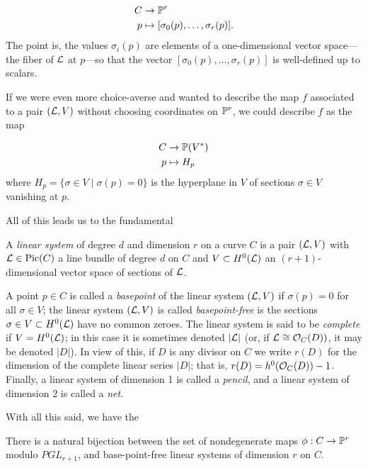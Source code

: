 \begin{align*}
C &\to \PP^r \\
p &\mapsto [\sigma_0(p),\dots,\sigma_r(p)].
\end{align*}
The point is,  the values $\sigma_i(p)$ are elements of a one-dimensional vector space---the fiber of $\cL$ at $p$---so that the vector $[\sigma_0(p),\dots,\sigma_r(p)]$ is well-defined up to scalars.

If we were even more choice-averse and wanted to describe the map $f$ associated to a pair $(\cL, V)$ without choosing coordinates on $\PP^r$, we could describe $f$ as the map

\begin{align*}
C &\to \PP(V^*) \\
p &\mapsto H_p
\end{align*}
where $H_p = \{\sigma \in V \mid \sigma(p) = 0\}$ is the hyperplane in $V$ of sections $\sigma \in V$ vanishing at $p$.

All of this leads us to the fundamental

\begin{definition}
A \emph{linear system} of degree $d$ and dimension $r$ on a curve $C$ is a pair $(\cL, V)$ with $\cL \in \Pic(C)$ a line bundle of degree $d$ on $C$ and $V \subset H^0(\cL)$ an $(r+1)$-dimensional vector space of sections of $\cL$.
\end{definition}

A point $p \in C$ is called a \emph{basepoint} of the linear system $(\cL,V)$ if $\sigma(p)=0$ for all $\sigma \in V$; the linear system $(\cL,V)$ is called \emph{basepoint-free} is the sections $\sigma \in V \subset H^0(\cL)$ have no common zeroes. The linear system is said to be \emph{complete} if $V = H^0(\cL)$; in this case it is sometimes denoted $|\cL|$ (or, if $\cL \cong \cO_C(D))$, it may be denoted $|D|$). In view of this, if $D$ is any divisor on $C$ we write $r(D)$ for the dimension of the complete linear series $|D|$; that is, $r(D) = h^0(\cO_C(D)) - 1$. Finally, a linear system of dimension 1 is called a \emph{pencil}, and a linear system of dimension 2 is called a \emph{net}.

With all this said, we have the 

\begin{proposition}
There is a natural bijection between the set of nondegenerate maps $\phi : C \to \PP^r$ modulo $PGL_{r+1}$, and base-point-free linear systems of dimension $r$ on $C$.
\end{proposition}

